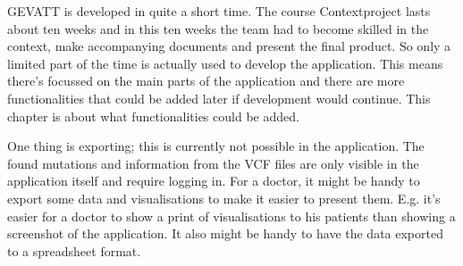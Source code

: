 GEVATT is developed in quite a short time. The course Contextproject lasts about ten weeks and in this ten weeks the team had to become skilled in the context, make accompanying documents	 and present the final product. So only a limited part of the time is actually used to develop the application. This means there's focussed on the main parts of the application and there are more functionalities that could be added later if development would continue. This chapter is about what functionalities  could be added.

One thing is exporting; this is currently not possible in the application. The found mutations and information from the VCF files are only visible in the application itself and require logging in. For a doctor, it might be handy to export some data and visualisations to make it easier to present them. E.g. it's easier for a doctor to show a print of visualisations to his patients than showing a screenshot of the application. It also might be handy to have the data exported to a spreadsheet format.


